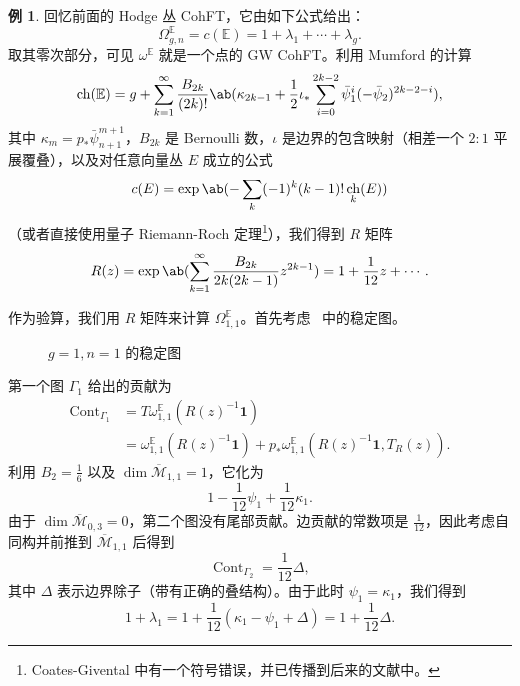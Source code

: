 \documentclass{amsart}
\theoremstyle{definition}
\newtheorem{exm}[thm]{例}
\theoremstyle{remark}
\theoremstyle{plain}
\theoremstyle{definition}
\theoremstyle{remark}
\newcommand{\E}{\mathbb{E}}
\newcommand{\Mbar}{\overline{\mathcal{M}}}
\newcommand{\1}{\mathbf{1}}
\newcommand{\2}{\mathbf{2}}
\newcommand{\3}{\mathbf{3}}
\DeclareMathOperator{\ch}{ch}
\DeclareMathOperator{\Cont}{Cont}
\begin{document}
\begin{exm}
    回忆前面的 Hodge 丛 CohFT，它由如下公式给出：
    \[ \Omega^{\E}_{g,n} = c(\E) = 1 + \lambda_1 + \cdots + \lambda_g. \]
    取其零次部分，可见 $\omega^{\E}$ 就是一个点的 GW CohFT。利用 Mumford 的计算
    \[ \ch(\E) = g + \sum_{k=1}^{\infty} \frac{B_{2k}}{(2k)!}\ab(\kappa_{2k-1} + \frac{1}{2}\iota_*\sum_{i=0}^{2k-2} \bar{\psi}_1^{i} (-\bar{\psi}_2)^{2k-2-i}), \]
    其中 $\kappa_{m} = p_* \bar{\psi}_{n+1}^{m+1}$，$B_{2k}$ 是 Bernoulli 数，$\iota$ 是边界的包含映射（相差一个 $2:1$ 平展覆叠），以及对任意向量丛 $E$ 成立的公式
    \[ c(E) = \exp \ab(-\sum_k (-1)^k (k-1)!\ch_k(E)) \]
    （或者直接使用量子 Riemann-Roch 定理\footnote{Coates-Givental 中有一个符号错误，并已传播到后来的文献中。}），我们得到 $R$ 矩阵
    \[ R(z) = \exp\ab( \sum_{k=1}^{\infty} \frac{B_{2k}}{2k(2k-1)} z^{2k-1}) = 1+\frac{1}{12}z + \cdots. \]

    作为验算，我们用 $R$ 矩阵来计算 $\Omega_{1,1}^{\E}$。首先考虑~ 中的稳定图。
    \begin{figure}[htpb]
    \begin{center}
    \end{center}
    \caption{$g=1, n=1$ 的稳定图}%
    \label{fig:03graphloop}
    \end{figure}
    第一个图 $\Gamma_1$ 给出的贡献为
    \begin{align*}
        \Cont_{\Gamma_1} &= T\omega_{1,1}^{\E}(R(z)^{-1}\1) \\
        &= \omega_{1,1}^{\E}(R(z)^{-1}\1) + p_* \omega_{1,1}^{\E}(R(z)^{-1}\1, T_R(z)).
    \end{align*}
    利用 $B_2 = \frac{1}{6}$ 以及 $\dim \Mbar_{1,1} = 1$，它化为
    \[ 1 - \frac{1}{12}\psi_1 + \frac{1}{12} \kappa_1. \]
    由于 $\dim \Mbar_{0,3} = 0$，第二个图没有尾部贡献。边贡献的常数项是 $\frac{1}{12}$，因此考虑自同构并前推到 $\Mbar_{1,1}$ 后得到
    \[ \Cont_{\Gamma_2} = \frac{1}{12} \Delta, \]
    其中 $\Delta$ 表示边界除子（带有正确的叠结构）。由于此时 $\psi_1 = \kappa_1$，我们得到
    \[ 1+\lambda_1 = 1 + \frac{1}{12}(\kappa_1 - \psi_1 + \Delta) = 1 + \frac{1}{12} \Delta. \]
\end{exm}
\end{document}
